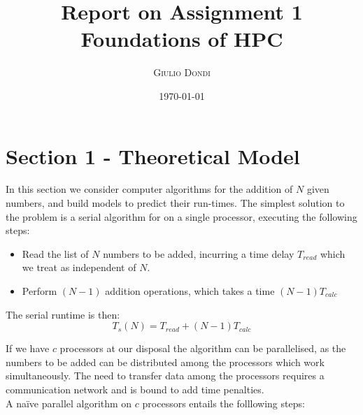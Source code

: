 \documentclass{article}
\title{Report on Assignment 1 \\ Foundations of HPC} %
\author{\textsc{Giulio Dondi}} %
\date{\today} %
\begin{document}
\maketitle %



\tableofcontents






\section{Section 1 - Theoretical Model}

In this section we consider computer algorithms for the addition of $N$ given numbers, and build models to predict their run-times. The simplest solution to the problem is a serial algorithm for on a single processor, executing the following steps: 
\begin{itemize}
\item Read the list of $N$ numbers to be added, incurring a time delay $T_{read}$ which we treat as independent of $N$.
\item Perform $\left( N - 1 \right)$ addition operations, which takes a time $\left( N - 1 \right)T_{calc}$
\end{itemize}

The serial runtime is then:
\begin{equation}
T_s \left( N \right) = T_{read} +  \left( N -1 \right)T_{calc}
\end{equation}

If we have $c$ processors at our disposal the algorithm can be parallelised, as the numbers to be added can be distributed among the processors which work simultaneously. The need to transfer data among the processors requires a communication network and is bound to add time penalties.\\
A na\"ive parallel algorithm on $c$ processors entails the folllowing steps:
\end{document}
